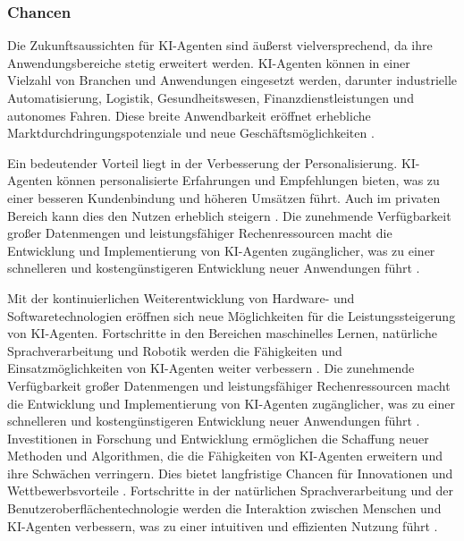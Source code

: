 \documentclass[conference]{IEEEtran}
\begin{document}
\subsubsection{Chancen}
Die Zukunftsaussichten für KI-Agenten sind äußerst vielversprechend, da ihre Anwendungsbereiche stetig erweitert werden. KI-Agenten können in einer Vielzahl von Branchen und Anwendungen eingesetzt werden, darunter industrielle Automatisierung, Logistik, Gesundheitswesen, Finanzdienstleistungen und autonomes Fahren. Diese breite Anwendbarkeit eröffnet erhebliche Marktdurchdringungspotenziale und neue Geschäftsmöglichkeiten   \cite{noauthor_was_nodate}.

Ein bedeutender Vorteil liegt in der Verbesserung der Personalisierung. KI-Agenten können personalisierte Erfahrungen und Empfehlungen bieten, was zu einer besseren Kundenbindung und höheren Umsätzen führt. Auch im privaten Bereich kann dies den Nutzen erheblich steigern \cite{lappin_assessing_2024}. Die zunehmende Verfügbarkeit großer Datenmengen und leistungsfähiger Rechenressourcen macht die Entwicklung und Implementierung von KI-Agenten zugänglicher, was zu einer schnelleren und kostengünstigeren Entwicklung neuer Anwendungen führt  \cite{dagher_evolution_2023}.

Mit der kontinuierlichen Weiterentwicklung von Hardware- und Softwaretechnologien eröffnen sich neue Möglichkeiten für die Leistungssteigerung von KI-Agenten. Fortschritte in den Bereichen maschinelles Lernen, natürliche Sprachverarbeitung und Robotik werden die Fähigkeiten und Einsatzmöglichkeiten von KI-Agenten weiter verbessern  \cite{lappin_assessing_2024}. Die zunehmende Verfügbarkeit großer Datenmengen und leistungsfähiger Rechenressourcen macht die Entwicklung und Implementierung von KI-Agenten zugänglicher, was zu einer schnelleren und kostengünstigeren Entwicklung neuer Anwendungen führt  \cite{noauthor_was_nodate}.
Investitionen in Forschung und Entwicklung ermöglichen die Schaffung neuer Methoden und Algorithmen, die die Fähigkeiten von KI-Agenten erweitern und ihre Schwächen verringern. Dies bietet langfristige Chancen für Innovationen und Wettbewerbsvorteile \cite{dagher_evolution_2023}. Fortschritte in der natürlichen Sprachverarbeitung und der Benutzeroberflächentechnologie werden die Interaktion zwischen Menschen und KI-Agenten verbessern, was zu einer intuitiven und effizienten Nutzung führt \cite{v-hanki_was_2023}.
\end{document}
